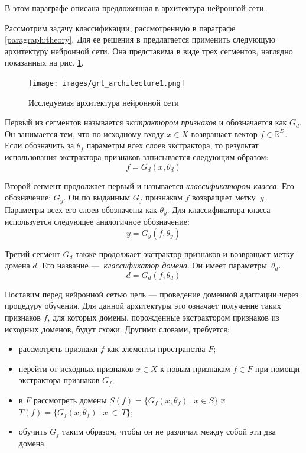 \documentclass[14pt, a4paper]{extarticle}
\begin{document}
В этом параграфе описана предложенная в \cite{ganin} архитектура нейронной сети. 

Рассмотрим задачу классификации, рассмотренную в параграфе \ref{paragraph:theory}. Для ее решения в \cite{ganin} предлагается применить следующую архитектуру нейронной сети. Она представима в виде трех сегментов, наглядно показанных на рис. \ref{figure:architecture}.
 
\begin{figure}[h]
	\texttt{[image: images/grl\_architecture1.png]}
	\caption{Исследуемая архитектура нейронной сети}
	\label{figure:architecture}
\end{figure}
 
Первый из сегментов называется \textit{экстрактором признаков} и обозначается как $G_d$. Он занимается тем, что по исходному входу $x \in X$ возвращает вектор $f \in \mathbb{R}^D$. Если обозначить за $\theta_f$ параметры всех слоев экстрактора, то результат использования экстрактора признаков записывается следующим образом:
\begin{equation*}
	 f = G_d(x, \theta_d)
\end{equation*}
 
Второй сегмент продолжает первый и называется \textit{классификатором класса}. Его обозначение: $G_y$. Он по выданным $G_f$ признакам $f$ возвращает метку~$y$. Параметры всех его слоев обозначены как $\theta_y$. Для классификатора класса используется следующее аналогичное обозначение:
\begin{equation*}
	y = G_y(f, \theta_y)
\end{equation*}
 
Третий сегмент $G_d$ также продолжает экстрактор признаков и возвращает метку домена $d$. Его название — \textit{классификатор домена}. Он имеет параметры~$\theta_d$.
\begin{equation*}
	d = G_d(f, \theta_d)
\end{equation*}

Поставим перед нейронной сетью цель — проведение доменной адаптации через процедуру обучения.
Для данной архитектуры это означает получение таких признаков $f$, для которых домены, порожденные экстрактором признаков из исходных доменов, будут схожи. Другими словами, требуется:
\begin{itemize}
	\item рассмотреть признаки $f$ как элементы пространства $F$;
	\item перейти от исходных признаков $x \in X$ к новым признакам $f \in F$ при помощи экстрактора признаков $G_f$;
	\item в $F$ рассмотреть домены $S(f) = \{G_f(x; \theta_f)~|~x \in S \}$ и $T(f) = \{G_f(x; \theta_f)~|~x~\in~T\}$;
	\item обучить $G_f$ таким образом, чтобы он не различал между собой эти два домена.
\end{itemize}
\end{document}
